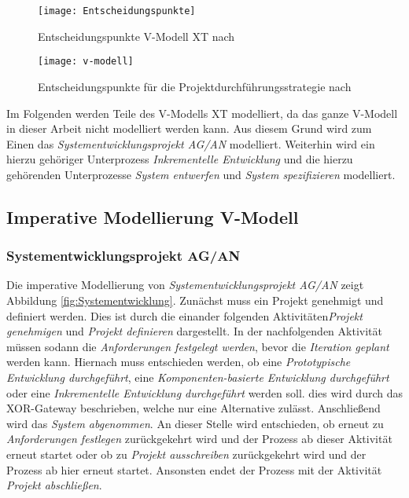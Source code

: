  
 
 \begin{figure}[!htbp]
\begin{center}
  \texttt{[image: Entscheidungspunkte]} %
  \caption{Entscheidungspunkte V-Modell XT nach \cite{2004vmodell}}
  \label{fig:entscheidungspunkte}
\end{center}
\end{figure}
 
\begin{sidewaysfigure}[!htbp]
\begin{center}
  \texttt{[image: v-modell]} %
  \caption{Entscheidungspunkte für die Projektdurchführungsstrategie nach \cite{2004vmodell}}
  \label{fig:v-modell}
\end{center}
\end{sidewaysfigure}

Im Folgenden werden Teile des V-Modells XT modelliert, da das ganze V-Modell in dieser Arbeit nicht  modelliert werden kann. Aus diesem Grund wird zum Einen das \textit{Systementwicklungsprojekt AG/AN} modelliert. Weiterhin wird ein hierzu gehöriger Unterprozess \textit{Inkrementelle Entwicklung} und die hierzu gehörenden Unterprozesse \textit{System entwerfen} und \textit{System spezifizieren} modelliert.
\clearpage

\subsection{Imperative Modellierung V-Modell}



\subsubsection{Systementwicklungsprojekt AG/AN}


Die imperative Modellierung von \textit{Systementwicklungsprojekt AG/AN}  zeigt Abbildung \ref{fig:Systementwicklung}. \newline
Zunächst muss ein Projekt genehmigt und definiert werden. Dies ist durch die einander folgenden Aktivitäten\textit{Projekt genehmigen} und \textit{Projekt definieren} dargestellt.\newline
In der nachfolgenden Aktivität müssen sodann die \textit{Anforderungen festgelegt werden}, bevor die \textit{Iteration geplant} werden kann. \newline
Hiernach muss entschieden werden, ob eine \textit{Prototypische Entwicklung durchgeführt}, eine \textit{Komponenten-basierte Entwicklung durchgeführt} oder eine \textit{Inkrementelle Entwicklung durchgeführt} werden soll. dies wird durch das XOR-Gateway beschrieben, welche nur eine Alternative zulässt.\newline
Anschließend wird das \textit{System abgenommen}.\newline
An dieser Stelle wird entschieden, ob erneut zu \textit{Anforderungen festlegen} zurückgekehrt wird und der Prozess ab dieser Aktivität erneut startet oder ob zu \textit{Projekt ausschreiben} zurückgekehrt wird und der Prozess ab hier erneut startet. Ansonsten endet der Prozess mit der Aktivität \textit{Projekt abschließen}.

